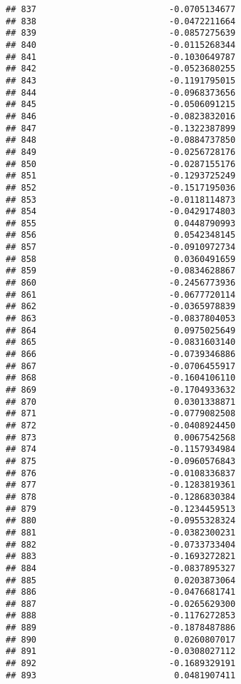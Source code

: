 \documentclass[
]{article}
\begin{document}
\begin{verbatim}
## 837                          -0.0705134677
## 838                          -0.0472211664
## 839                          -0.0857275639
## 840                          -0.0115268344
## 841                          -0.1030649787
## 842                          -0.0523680255
## 843                          -0.1191795015
## 844                          -0.0968373656
## 845                          -0.0506091215
## 846                          -0.0823832016
## 847                          -0.1322387899
## 848                          -0.0884737850
## 849                          -0.0256728176
## 850                          -0.0287155176
## 851                          -0.1293725249
## 852                          -0.1517195036
## 853                          -0.0118114873
## 854                          -0.0429174803
## 855                           0.0448790993
## 856                           0.0542348145
## 857                          -0.0910972734
## 858                           0.0360491659
## 859                          -0.0834628867
## 860                          -0.2456773936
## 861                          -0.0677720114
## 862                          -0.0365978839
## 863                          -0.0837804053
## 864                           0.0975025649
## 865                          -0.0831603140
## 866                          -0.0739346886
## 867                          -0.0706455917
## 868                          -0.1604106110
## 869                          -0.1704933632
## 870                           0.0301338871
## 871                          -0.0779082508
## 872                          -0.0408924450
## 873                           0.0067542568
## 874                          -0.1157934984
## 875                          -0.0960576843
## 876                          -0.0108336837
## 877                          -0.1283819361
## 878                          -0.1286830384
## 879                          -0.1234459513
## 880                          -0.0955328324
## 881                          -0.0382300231
## 882                          -0.0733733404
## 883                          -0.1693272821
## 884                          -0.0837895327
## 885                           0.0203873064
## 886                          -0.0476681741
## 887                          -0.0265629300
## 888                          -0.1176272853
## 889                          -0.1878487886
## 890                           0.0260807017
## 891                          -0.0308027112
## 892                          -0.1689329191
## 893                           0.0481907411

\end{verbatim}
\end{document}

